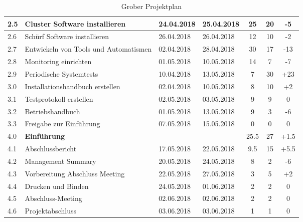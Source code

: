 \begin{table}[H]
\begin{tabular}{|p{0.7cm}p{6.8cm}p{2cm}p{2cm}|c|c|c|}
2.5 & Cluster Software installieren & 24.04.2018 & 25.04.2018 & 25 & 20 & -5 \\\hline
2.6 & Schürf Software installieren & 26.04.2018 & 26.04.2018 & 12 & 10 & -2 \\\hline
2.7 & Entwickeln von Tools und Automatismen & 02.04.2018 & 28.04.2018 & 30 & 17 &  -13 \\\hline
2.8 & Monitoring einrichten & 01.05.2018 & 10.05.2018 & 14 & 7 & -7\\\hline
2.9 & Periodische Systemtests & 10.04.2018 & 13.05.2018 & 7 & 30 & +23\\\hline
3.0 & Installationshandbuch erstellen & 02.04.2018 & 10.05.2018 & 8 & 10 & +2  \\\hline
3.1 & Testprotokoll erstellen & 02.05.2018 & 03.05.2018 & 9 & 9 & 0 \\\hline
3.2 & Betriebshandbuch & 01.05.2018 & 13.05.2018 & 9 & 3 & -6\\\hline
3.3 & Freigabe zur Einführung & 07.05.2018 & 15.05.2018 & 0 & 0 & 0 \\\hline
\rowcolor{subheading} 4.0 & \textbf{Einführung} & & & 25.5 & 27 & +1.5 \\\hline
4.1 & Abschlussbericht & 17.05.2018 & 22.05.2018 & 9.5 & 15 & +5.5 \\\hline
4.2 & Management Summary & 20.05.2018 & 24.05.2018 & 8 & 2 & -6 \\\hline
4.3 & Vorbereitung  Abschluss Meeting & 22.05.2018 & 27.05.2018 & 3 & 5 & +2 \\\hline
4.4 & Drucken und Binden & 24.05.2018 & 01.06.2018 & 2 & 2 & 0 \\\hline
4.5 & Abschluss-Meeting & 02.06.2018 & 02.06.2018 & 2 & 2 & 0 \\\hline
4.6 & Projektabschluss & 03.06.2018 & 03.06.2018 & 1 & 1 & 0 \\\hline
\end{tabular}
\caption{Grober Projektplan}
\end{table}

